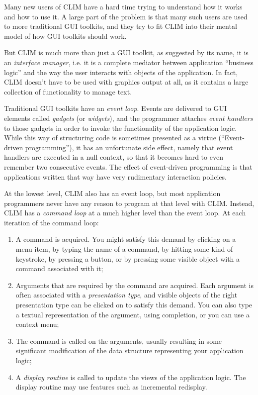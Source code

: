 Many new users of CLIM have a hard time trying to understand how it
works and how to use it.  A large part of the problem is that many such
users are used to more traditional GUI toolkits, and they try to fit
CLIM into their mental model of how GUI toolkits should work.

But CLIM is much more than just a GUI toolkit, as suggested by its name,
it is an \emph{interface manager}, i.e. it is a complete mediator
between application ``business logic'' and the way the user interacts
with objects of the application.  In fact, CLIM doesn't have to be used
with graphics output at all, as it contains a large collection of
functionality to manage text.

Traditional GUI toolkits have an \emph{event loop}.
Events are delivered to GUI elements called \emph{gadgets} (or
\emph{widgets}), and the programmer attaches \emph{event handlers} to
those gadgets in order to invoke the functionality of the application
logic.  While this way of structuring code is sometimes presented as a
virtue (``Event-driven programming''), it has an unfortunate side
effect, namely that event handlers are executed in a null context, so
that it becomes hard to even remember two consecutive events.  The
effect of event-driven programming is that applications written that way
have very rudimentary interaction policies.

At the lowest level, CLIM also has an event loop, but most application
programmers never have any reason to program at that level with CLIM.
Instead, CLIM has a \emph{command loop}
at a much higher level than the event loop.  At each iteration of the
command loop:

\begin{enumerate}
\item
 A command is acquired.  You might satisfy this demand by clicking on a
  menu item, by typing the name of a command, by hitting some kind of
  keystroke, by pressing a button, or by pressing some visible object
  with a command associated with it;
\item
 Arguments that are required by the command are acquired.  Each argument
    is often associated with a \emph{presentation type}, and visible
    objects of the right presentation type can be clicked on to satisfy
    this demand.  You can also type a textual representation of the
    argument, using completion, or you can use a context menu;
\item
 The command is called on the arguments, usually resulting in some
    significant modification of the data structure representing your
    application logic;
\item
 A \emph{display routine} is called to update the views of the
  application logic.  The display routine may use features such as
  incremental redisplay.
\end{enumerate}

